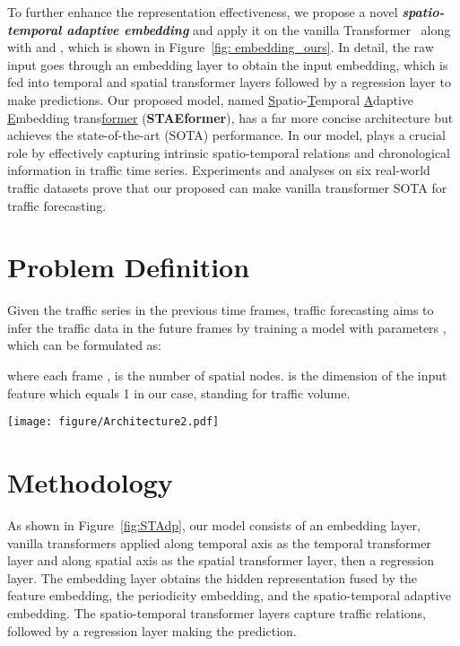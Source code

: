 \documentclass[sigconf]{acmart}
\begin{document}
To further enhance the representation effectiveness, 
we propose a novel \textbf{\textit{spatio-temporal adaptive embedding}}  and apply it on the vanilla Transformer~\cite{attention} along with  and , which is shown in Figure~\ref{fig: embedding_ours}. In detail, the raw input goes through an embedding layer to obtain the input embedding, which is fed into temporal and spatial transformer layers followed by a regression layer to make predictions. Our proposed model, named \underline{S}patio-\underline{T}emporal \underline{A}daptive \underline{E}mbedding trans\underline{former} (\textbf{STAEformer}), has a far more concise architecture but achieves the state-of-the-art (SOTA) performance. In our model,  plays a crucial role by effectively capturing intrinsic spatio-temporal relations and chronological information in traffic time series. Experiments and analyses on six real-world traffic datasets prove that our proposed  can make vanilla transformer SOTA for traffic forecasting.

\section{Problem Definition}
Given the traffic series  in the previous  time frames, traffic forecasting aims to infer the traffic data in the future  frames by training a model  with parameters , which can be formulated as:

\noindent where each frame ,  is the number of spatial nodes.  is the dimension of the input feature which equals 1 in our case, standing for traffic volume. 




\begin{figure*}[t]   \centering \texttt{[image: figure/Architecture2.pdf]} \caption{The Architecture of \underline{S}patio-\underline{T}emporal \underline{A}daptive \underline{E}mbedding trans\underline{former} (\textbf{STAEformer}).}
\label{fig:STAdp}   \end{figure*}

\section{Methodology}
As shown in Figure~\ref{fig:STAdp}, our model consists of an embedding layer, vanilla transformers applied along temporal axis as the temporal transformer layer and along spatial axis as the spatial transformer layer, then a regression layer. The embedding layer obtains the hidden representation fused by the feature embedding, the periodicity embedding, and the spatio-temporal adaptive embedding. The spatio-temporal transformer layers capture traffic relations, followed by a regression layer making the prediction.
\end{document}
